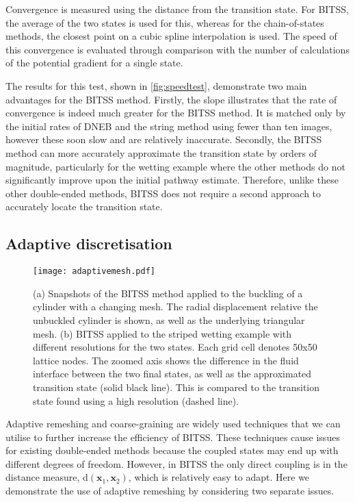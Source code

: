 \documentclass[twocolumn,10pt]{revtex4}
\begin{document}
Convergence is measured using the distance from the transition state.
For BITSS, the average of the two states is used for this, whereas for the chain-of-states methods, the closest point on a cubic spline interpolation is used.
The speed of this convergence is evaluated through comparison with the number of calculations of the potential gradient for a single state.

The results for this test, shown in \cref{fig:speedtest}, demonstrate two main advantages for the BITSS method.
Firstly, the slope illustrates that the rate of convergence is indeed much greater for the BITSS method.
It is matched only by the initial rates of DNEB and the string method using fewer than ten images, however these soon slow and are relatively inaccurate.
Secondly, the BITSS method can more accurately approximate the transition state by orders of magnitude, particularly for the wetting example where the other methods do not significantly improve upon the initial pathway estimate.
Therefore, unlike these other double-ended methods, BITSS does not require a second approach to accurately locate the transition state.


\subsection{Adaptive discretisation}\label{sec:adaptive}
\begin{figure}[tb]
  \texttt{[image: adaptivemesh.pdf]}
  \caption{\label{fig:adaptivemesh}
    (a) Snapshots of the BITSS method applied to the buckling of a cylinder with a changing mesh.
        The radial displacement relative the unbuckled cylinder is shown, as well as the underlying triangular mesh.
    (b) BITSS applied to the striped wetting example with different resolutions for the two states.
        Each grid cell denotes 50x50 lattice nodes.
        The zoomed axis shows the difference in the fluid interface between the two final states, as well as the approximated transition state (solid black line).
        This is compared to the transition state found using a high resolution (dashed line).
  }
\end{figure}

Adaptive remeshing and coarse-graining are widely used techniques that we can utilise to further increase the efficiency of BITSS.
These techniques cause issues for existing double-ended methods because the coupled states may end up with different degrees of freedom.
However, in BITSS the only direct coupling is in the distance measure, $\mathrm{d}(\bm{x}_1,\bm{x}_2)$, which is relatively easy to adapt.
Here we demonstrate the use of adaptive remeshing by considering two separate issues.
\end{document}
